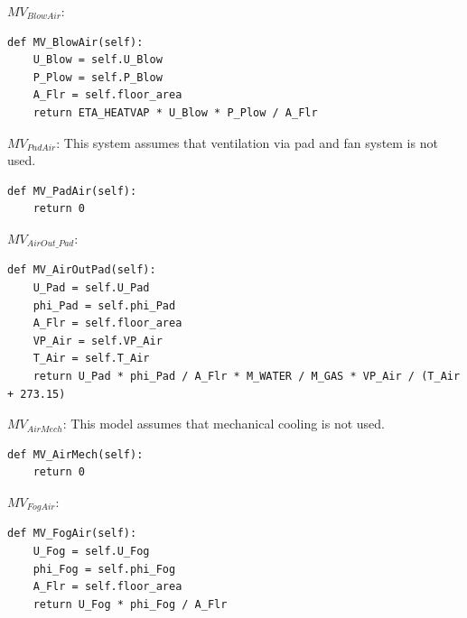 \documentclass[a4paper]{article}
\numberwithin{equation}{section}
\begin{document}
\( MV_{BlowAir} \):
\begin{mdframed}[leftline=false,rightline=false,backgroundcolor=magenta!10,nobreak=true]
  \begin{verbatim}
def MV_BlowAir(self):
    U_Blow = self.U_Blow
    P_Plow = self.P_Blow
    A_Flr = self.floor_area
    return ETA_HEATVAP * U_Blow * P_Plow / A_Flr
  \end{verbatim}
\end{mdframed}

\( MV_{PadAir} \):
This system assumes that ventilation via pad and fan system is not used.
\begin{mdframed}[leftline=false,rightline=false,backgroundcolor=magenta!10,nobreak=true]
  \begin{verbatim}
def MV_PadAir(self):
    return 0
  \end{verbatim}
\end{mdframed}

\( MV_{AirOut\_Pad} \):
\begin{mdframed}[leftline=false,rightline=false,backgroundcolor=magenta!10,nobreak=true]
  \begin{verbatim}
def MV_AirOutPad(self):
    U_Pad = self.U_Pad
    phi_Pad = self.phi_Pad
    A_Flr = self.floor_area
    VP_Air = self.VP_Air
    T_Air = self.T_Air
    return U_Pad * phi_Pad / A_Flr * M_WATER / M_GAS * VP_Air / (T_Air + 273.15)
  \end{verbatim}
\end{mdframed}

\( MV_{AirMech} \):
This model assumes that mechanical cooling is not used.
\begin{mdframed}[leftline=false,rightline=false,backgroundcolor=magenta!10,nobreak=true]
  \begin{verbatim}
def MV_AirMech(self):
    return 0
  \end{verbatim}
\end{mdframed}

\( MV_{FogAir} \):
\begin{mdframed}[leftline=false,rightline=false,backgroundcolor=magenta!10,nobreak=true]
  \begin{verbatim}
def MV_FogAir(self):
    U_Fog = self.U_Fog
    phi_Fog = self.phi_Fog
    A_Flr = self.floor_area
    return U_Fog * phi_Fog / A_Flr
  \end{verbatim}
\end{mdframed}
\end{document}
